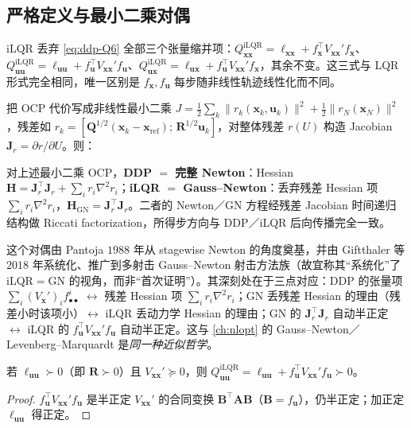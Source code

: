 \subsection{严格定义与最小二乘对偶}
\label{sec:ddp-gn-dual}

iLQR 丢弃 \cref{eq:ddp-Q6} 全部三个张量缩并项：$Q_{\mathbf{xx}}^{\mathrm{iLQR}}=\ell_{\mathbf{xx}}+f_{\mathbf{x}}^\top V_{\mathbf{xx}}'f_{\mathbf{x}}$、$Q_{\mathbf{uu}}^{\mathrm{iLQR}}=\ell_{\mathbf{uu}}+f_{\mathbf{u}}^\top V_{\mathbf{xx}}'f_{\mathbf{u}}$、$Q_{\mathbf{ux}}^{\mathrm{iLQR}}=\ell_{\mathbf{ux}}+f_{\mathbf{u}}^\top V_{\mathbf{xx}}'f_{\mathbf{x}}$，其余不变。这三式与 LQR 形式完全相同，唯一区别是 $f_{\mathbf{x}},f_{\mathbf{u}}$ 每步随非线性轨迹线性化而不同。

把 OCP 代价写成非线性最小二乘 $J=\tfrac12\sum_k\|r_k(\mathbf{x}_k,\mathbf{u}_k)\|^2+\tfrac12\|r_N(\mathbf{x}_N)\|^2$，残差如 $r_k=[\mathbf{Q}^{1/2}(\mathbf{x}_k-\mathbf{x}_{\mathrm{ref}});\,\mathbf{R}^{1/2}\mathbf{u}_k]$，对整体残差 $r(U)$ 构造 Jacobian $\mathbf{J}_r=\partial r/\partial U$。则：

\begin{theorem}[iLQR $=$ Gauss--Newton 的 Riccati 求解]
\label{thm:ddp-gn}
对上述最小二乘 OCP，\textbf{DDP $=$ 完整 Newton}：Hessian $\mathbf{H}=\mathbf{J}_r^\top\mathbf{J}_r+\sum_i r_i\nabla^2 r_i$；\textbf{iLQR $=$ Gauss--Newton}：丢弃残差 Hessian 项 $\sum_i r_i\nabla^2 r_i$，$\mathbf{H}_{\mathrm{GN}}=\mathbf{J}_r^\top\mathbf{J}_r$。二者的 Newton／GN 方程经残差 Jacobian 时间递归结构做 Riccati factorization，所得步方向与 DDP／iLQR 后向传播完全一致。
\end{theorem}

这个对偶由 Pantoja $1988$ 年从 stagewise Newton 的角度奠基\cite{pantoja1988ddp}，并由 Giftthaler 等 $2018$ 年系统化、推广到多射击 Gauss--Newton 射击方法族\cite{giftthaler2018gnms}（故宜称其“系统化”了 iLQR$=$GN 的视角，而非“首次证明”）。其深刻处在于三点对应：DDP 的张量项 $\sum_i(V_{\mathbf{x}}')_i f^i_{\bullet\bullet}$ $\leftrightarrow$ 残差 Hessian 项 $\sum_i r_i\nabla^2 r_i$；GN 丢残差 Hessian 的理由（残差小时该项小）$\leftrightarrow$ iLQR 丢动力学 Hessian 的理由；GN 的 $\mathbf{J}_r^\top\mathbf{J}_r$ 自动半正定 $\leftrightarrow$ iLQR 的 $f_{\mathbf{u}}^\top V_{\mathbf{xx}}'f_{\mathbf{u}}$ 自动半正定。这与 \cref{ch:nlopt} 的 Gauss--Newton／Levenberg--Marquardt 是\emph{同一种近似哲学}。

\begin{proposition}
\label{prop:ddp-quu-pd}
若 $\ell_{\mathbf{uu}}\succ0$（即 $\mathbf{R}\succ0$）且 $V_{\mathbf{xx}}'\succeq0$，则 $Q_{\mathbf{uu}}^{\mathrm{iLQR}}=\ell_{\mathbf{uu}}+f_{\mathbf{u}}^\top V_{\mathbf{xx}}'f_{\mathbf{u}}\succ0$。
\end{proposition}
\begin{proof}
$f_{\mathbf{u}}^\top V_{\mathbf{xx}}'f_{\mathbf{u}}$ 是半正定 $V_{\mathbf{xx}}'$ 的合同变换 $\mathbf{B}^\top\mathbf{A}\mathbf{B}$（$\mathbf{B}=f_{\mathbf{u}}$），仍半正定；加正定 $\ell_{\mathbf{uu}}$ 得正定。
\end{proof}

